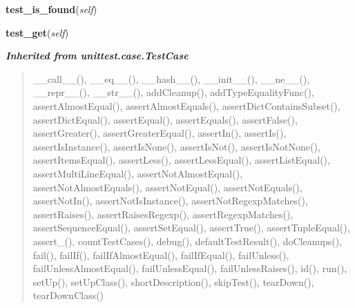     \vspace{0.5ex}

\hspace{.8\funcindent}\begin{boxedminipage}{\funcwidth}

    \raggedright \textbf{test\_is\_found}(\textit{self})

\setlength{\parskip}{2ex}
\setlength{\parskip}{1ex}
    \end{boxedminipage}

    \label{UnBlockMeSolver:test:MapTests:readerTests:TestReader:test_get}

    \vspace{0.5ex}

\hspace{.8\funcindent}\begin{boxedminipage}{\funcwidth}

    \raggedright \textbf{test\_get}(\textit{self})

\setlength{\parskip}{2ex}
\setlength{\parskip}{1ex}
    \end{boxedminipage}


\large{\textbf{\textit{Inherited from unittest.case.TestCase}}}

\begin{quote}
\_\_call\_\_(), \_\_eq\_\_(), \_\_hash\_\_(), \_\_init\_\_(), \_\_ne\_\_(), \_\_repr\_\_(), \_\_str\_\_(), addCleanup(), addTypeEqualityFunc(), assertAlmostEqual(), assertAlmostEquals(), assertDictContainsSubset(), assertDictEqual(), assertEqual(), assertEquals(), assertFalse(), assertGreater(), assertGreaterEqual(), assertIn(), assertIs(), assertIsInstance(), assertIsNone(), assertIsNot(), assertIsNotNone(), assertItemsEqual(), assertLess(), assertLessEqual(), assertListEqual(), assertMultiLineEqual(), assertNotAlmostEqual(), assertNotAlmostEquals(), assertNotEqual(), assertNotEquals(), assertNotIn(), assertNotIsInstance(), assertNotRegexpMatches(), assertRaises(), assertRaisesRegexp(), assertRegexpMatches(), assertSequenceEqual(), assertSetEqual(), assertTrue(), assertTupleEqual(), assert\_(), countTestCases(), debug(), defaultTestResult(), doCleanups(), fail(), failIf(), failIfAlmostEqual(), failIfEqual(), failUnless(), failUnlessAlmostEqual(), failUnlessEqual(), failUnlessRaises(), id(), run(), setUp(), setUpClass(), shortDescription(), skipTest(), tearDown(), tearDownClass()
\end{quote}

